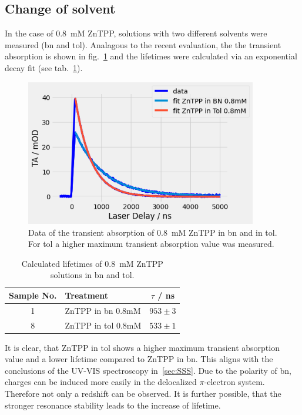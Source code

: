
\subsection*{Change of solvent}

In the case of \SI{0.8}{\milli\nauticalmile} ZnTPP, solutions with two different solvents were measured (bn and tol). Analagous to the recent evaluation, the the transient absorption is shown in fig.~\ref{fig:ZnTPP-bn-tol} and the lifetimes were calculated via an exponential decay fit (see tab.~\ref{fig:ZnTPP-bn-tol}).

\begin{figure}[h]
    \centering
    \includegraphics[width = 0.9\textwidth]{Bilder/Auswertung/TRAS/ZnTPP-bn-tol.png}
    \caption{Data of the transient absorption of \SI{0.8}{\milli\nauticalmile} ZnTPP in bn and in tol. For tol a higher maximum transient absorption value was measured.}
    \label{fig:ZnTPP-bn-tol}
\end{figure}


\begin{table}[ht]
    \centering
    \begin{tabular}{clc}
        \toprule
        Sample No. &    Treatment &    $\tau$ / \si{\nano\second} \\
        \midrule
        1 &     ZnTPP in bn 0.8mM &  $953 \pm 3$ \\
        8 &    ZnTPP in tol 0.8mM &  $533 \pm 1$ \\
        \bottomrule
    \end{tabular}
    \caption{Calculated lifetimes of \SI{0.8}{\milli\nauticalmile} ZnTPP solutions in bn and tol.}
    \label{tab:ZnTPP-bn-tol}
\end{table}

It is clear, that ZnTPP in tol shows a higher maximum transient absorption value and a lower lifetime compared to ZnTPP in bn. This aligns with the conclusions of the UV-VIS spectroscopy in~\ref{sec:SSS}. Due to the polarity of bn, charges can be induced more easily in the delocalized $\pi$-electron system. Therefore not only a redshift can be observed. It is further possible, that the stronger resonance stability leads to the increase of lifetime.

